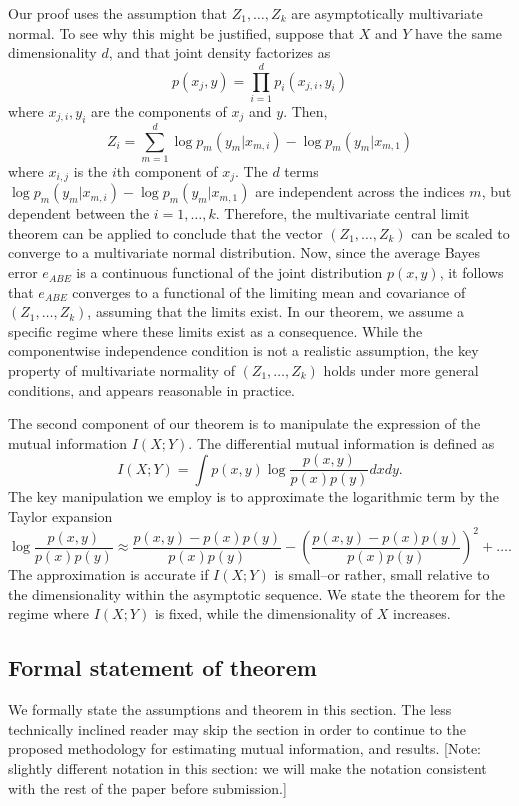 \documentclass[12pt]{article}
\begin{document}
Our proof uses the assumption that $Z_1,\hdots, Z_k$ are asymptotically multivariate normal.
To see why this might be justified, suppose that $X$ and $Y$ have the same dimensionality $d$, and that
joint density factorizes as
\[
p(x_j, y) = \prod_{i=1}^d p_i(x_{j, i}, y_i)
\]
where $x_{j, i}, y_i$ are the components of $x_j$ and $y$.
Then,
\[
Z_i = \sum_{m=1}^d \log p_m(y_m | x_{m, i}) - \log p_m(y_m | x_{m, 1})
\]
where $x_{i, j}$ is the $i$th component of $x_j$.
The $d$ terms $\log p_m(y_m | x_{m, i}) - \log p_m(y_m | x_{m, 1})$ are independent across the indices $m$,
but dependent between the $i = 1,\hdots, k$.
Therefore, the multivariate central limit theorem can be applied to conclude that the vector
$(Z_1,\hdots, Z_k)$ can be scaled to converge to a multivariate normal distribution.
Now, since the average Bayes error $e_{ABE}$ is a continuous functional of the joint distribution $p(x, y)$,
it follows that $e_{ABE}$ converges to a functional of the limiting mean and covariance of $(Z_1,\hdots, Z_k)$, assuming
that the limits exist.
In our theorem, we assume a specific regime where these limits exist as a consequence.
While the componentwise independence condition is not a realistic assumption,
the key property of multivariate normality of $(Z_1,\hdots, Z_k)$ holds under more general conditions, and appears reasonable in practice.

The second component of our theorem is to manipulate the expression of the mutual information $I(X; Y)$.
The differential mutual information is defined as
\[
I(X; Y) = \int p(x, y) \log \frac{p(x, y)}{p(x) p(y)} dx dy.
\]
The key manipulation we employ is to approximate the logarithmic term by the Taylor expansion
\[
\log \frac{p(x, y)}{p(x) p(y)} \approx \frac{p(x, y) - p(x) p(y)}{p(x) p(y)} - \left(\frac{p(x, y) - p(x) p(y)}{p(x) p(y)}\right)^2 + \hdots.
\]
The approximation is accurate if $I(X; Y)$ is small--or rather, small relative to the dimensionality within the asymptotic sequence.
We state the theorem for the regime where $I(X; Y)$ is fixed, while the dimensionality of $X$ increases.

\subsection{Formal statement of theorem}

We formally state the assumptions and theorem in this section.  The less technically inclined reader may skip the section in order to continue to the proposed methodology for estimating mutual information, and results. [Note: slightly different notation in this section: we will make the notation consistent with the rest of the paper before submission.]
\end{document}

